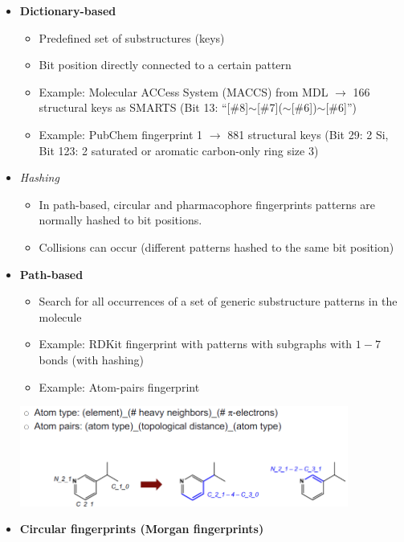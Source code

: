 \begin{itemize}
    \item \textbf{Dictionary-based}
    \begin{itemize}
        \item Predefined set of substructures (keys)
        \item Bit position directly connected to a certain pattern
        \item Example: Molecular ACCess System (MACCS) from MDL $\rightarrow$ 166 structural keys as SMARTS (Bit 13: “[$\#$8]$\sim$[$\#$7]($\sim$[$\#$6])$\sim$[$\#$6]”)
        \item Example: PubChem fingerprint 1 $\rightarrow$ 881 structural keys (Bit 29: 2 Si, Bit 123: 2 saturated or aromatic carbon-only ring size 3)
    \end{itemize}
    \item \emph{Hashing}
    \begin{itemize}
        \item In path-based, circular and pharmacophore fingerprints patterns are normally hashed to bit positions.
        \item Collisions can occur (different patterns hashed to the same bit position)
    \end{itemize}
    \item \textbf{Path-based}
    \begin{itemize}
        \item Search for all occurrences of a set of generic substructure patterns in the molecule
        \item Example: RDKit fingerprint with patterns with subgraphs with $1-7$ bonds (with hashing)
        \item Example: Atom-pairs fingerprint
    \end{itemize}
    \begin{center}\includegraphics[width=0.85\textwidth]{img/cheminformatics/FingerprintsPathBased.png}\end{center}
    \item \textbf{Circular fingerprints (Morgan fingerprints)}
    \begin{itemize}

\end{itemize}
\end{itemize}
